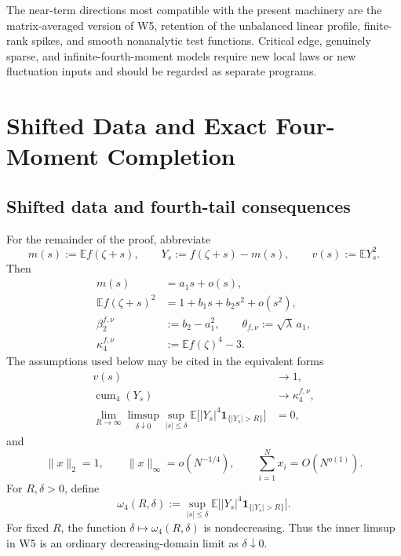 \documentclass[11pt]{article}
\theoremstyle{definition}
\theoremstyle{remark}
\newcommand{\E}{\mathbb E}
\newcommand{\cum}{\operatorname{cum}}
\newcommand{\one}{\mathbf 1}
\newcommand{\norm}[1]{\lVert #1\rVert}
\begin{document}
The near-term directions most compatible with the present machinery are the
matrix-averaged version of W5, retention of the unbalanced linear profile,
finite-rank spikes, and smooth nonanalytic test functions.  Critical edge,
genuinely sparse, and infinite-fourth-moment models require new local laws or
new fluctuation inputs and should be regarded as separate programs.

\appendix

\section{Shifted Data and Exact Four-Moment Completion}
\label{app:proof-notation}
\subsection{Shifted data and fourth-tail consequences}
\label{sec:R1-package}
For the remainder of the proof, abbreviate
\begin{equation}\label{eq:shifted-data-package}
 m(s):=\E f(\zeta+s),\qquad
 Y_s:=f(\zeta+s)-m(s),\qquad
 v(s):=\E Y_s^2.
\end{equation}
Then
\begin{align}
 m(s)&=a_1s+o(s),\label{eq:mean-profile-package}\\
 \E f(\zeta+s)^2&=1+b_1s+b_2s^2+o(s^2),
 \label{eq:second-profile-package}\\
 \beta_2^{f,\nu}&:=b_2-a_1^2,\qquad
 \theta_{f,\nu}:=\sqrt\lambda\,a_1,\label{eq:beta-package}\\
 \kappa_4^{f,\nu}&:=\E f(\zeta)^4-3.\label{eq:kappa-package}
\end{align}
The assumptions used below may be cited in the equivalent forms
\begin{align}
 v(s)&\longrightarrow1,\label{eq:W3-package}\\
 \cum_4(Y_s)&\longrightarrow\kappa_4^{f,\nu},\label{eq:W4-package}\\
 \lim_{R\to\infty}\limsup_{\delta\downarrow0}
 \sup_{|s|\le\delta}
 \E\bigl[|Y_s|^4\one_{\{|Y_s|>R\}}\bigr]&=0,
 \label{eq:W5-package}
\end{align}
and
\begin{equation}\label{eq:spike-package}
 \norm{x}_2=1,\qquad
 \norm{x}_\infty=o(N^{-1/4}),\qquad
 \sum_{i=1}^N x_i=O(N^{o(1)}).
\end{equation}
For \(R,\delta>0\), define
\begin{equation}\label{eq:tail-modulus-package}
 \omega_4(R,\delta)
 :=\sup_{|s|\le\delta}
 \E\bigl[|Y_s|^4\one_{\{|Y_s|>R\}}\bigr].
\end{equation}
For fixed \(R\), the function \(\delta\mapsto\omega_4(R,\delta)\) is
nondecreasing.  Thus the inner limsup in W5 is an ordinary decreasing-domain
limit as \(\delta\downarrow0\).
\end{document}

